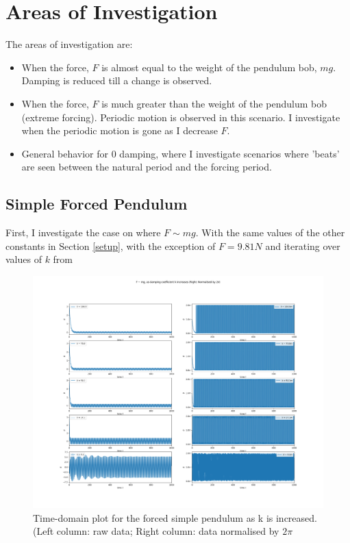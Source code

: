 \documentclass[10pt, twocolumn]{article}
\begin{document}
\twocolumn
\section{Areas of Investigation}
The areas of investigation are:
\begin{itemize}
    \item When the force, $F$ is almost equal to the weight of the pendulum bob, $mg$. Damping is reduced till a change is observed.
    \item When the force, $F$ is much greater than the weight of the pendulum bob (extreme forcing). Periodic motion is observed in this scenario. I investigate when the periodic motion is gone as I decrease $F$.
    \item General behavior for 0 damping, where I investigate scenarios where 'beats' are seen between the natural period and the forcing period.
\end{itemize}
 
\subsection{Simple Forced Pendulum}
First, I investigate the case on where $F \sim{mg}$. With the same values of the other constants in Section \ref{setup}, with the exception of $F = 9.81N$ and iterating over values of $k$ from 
\begin{figure}[H]
    \centering
    \includegraphics[width =\columnwidth]{Projects/ForcedSimplePendulum/Plots/F~mg as damping coefficient k increases.png}
    \caption{Time-domain plot for the forced simple pendulum as k is increased. (Left column: raw data; Right column: data normalised by $2\pi$}
    \label{fig:enter-label}
\end{figure}
\end{document}
